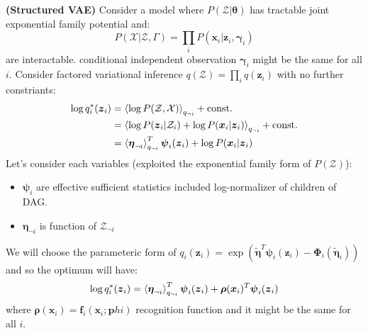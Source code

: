 \begin{definition}{\textbf{(Structured VAE)}}
    Consider a model where $P(\mathcal{Z}|\boldsymbol \theta)$ has tractable joint exponential family potential and:
    \begin{equation*}
        P(\mathcal{X}|\mathcal{Z},\Gamma) = \prod_iP(\boldsymbol x_i | \boldsymbol z_i, \boldsymbol \gamma_i)
    \end{equation*}
    are interactable. conditional independent observation $\boldsymbol \gamma_i$ might be the same for all $i$. Consider factored variational inference $q(\mathcal{Z}) = \prod_iq(\boldsymbol z_i)$ with no further constriants:
    \begin{equation*}
    \begin{aligned}
        \log q^*_i(\boldsymbol z_i) &= \left\langle \log P(\mathcal{Z},\mathcal{X}) \right\rangle_{q_{\neg i }} + \text{const.} \\
        &= \left\langle \log P(\boldsymbol z_i | \mathcal{Z}_i) + \log P(\boldsymbol x_i | \boldsymbol z_i) \right\rangle_{q_{\neg i}} + \text{const.} \\
        &= \left\langle \boldsymbol \eta_{\neg i} \right\rangle^T_{q_{\neg i}}\boldsymbol \psi_i(\boldsymbol z_i) + \log P(\boldsymbol x_i | \boldsymbol z_i)
    \end{aligned}
    \end{equation*}
    Let's consider each variables (exploited the exponential family form of $P(\mathcal{Z})$):
    \begin{itemize}
        \item $\boldsymbol \psi_i$ are effective sufficient statistics included log-normalizer of children of DAG.
        \item $\boldsymbol \eta_{\neg i}$ is function of $\mathcal{Z}_{\neg i}$
    \end{itemize}
    We will choose the parameteric form of $q_i(\boldsymbol z_i) = \exp(\tilde{\boldsymbol \eta}^T\boldsymbol \psi_i(\boldsymbol z_i) - \boldsymbol \Phi_i(\tilde{\boldsymbol \eta}_i))$ and so the optimum will have:
    \begin{equation*}
        \log q^*_i(\boldsymbol z_i) = \left\langle \boldsymbol \eta_{\neg i} \right\rangle^T_{q_{\neg i}}\boldsymbol \psi_i(\boldsymbol z_i) + \boldsymbol \rho(\boldsymbol x_i)^T\boldsymbol \psi_i(\boldsymbol z_i)
    \end{equation*}
    where $\boldsymbol \rho(\boldsymbol x_i) = \boldsymbol f_i(\boldsymbol x_i;\boldsymbol phi)$ recognition function and it might be the same for all $i$. 
\end{definition}

